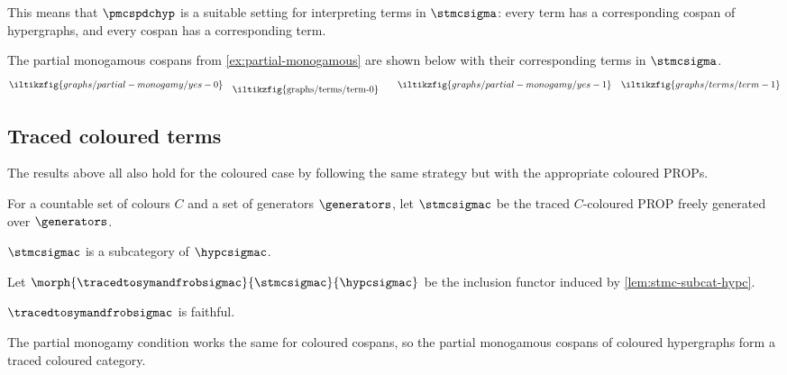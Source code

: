 This means that \(\pmcspdchyp\) is a suitable setting for interpreting terms in
\(\stmcsigma\): every term has a corresponding cospan of hypergraphs, and
every cospan has a corresponding term.

\begin{example}
    The partial monogamous cospans from \cref{ex:partial-monogamous} are shown
    below with their corresponding terms in \(\stmcsigma\).
    \[
        \iltikzfig{graphs/partial-monogamy/yes-0}
        \quad
        \raisebox{-0.5em}{\iltikzfig{graphs/terms/term-0}}
        \qquad
        \iltikzfig{graphs/partial-monogamy/yes-1}
        \quad
        \iltikzfig{graphs/terms/term-1}
    \]
\end{example}

\subsection{Traced coloured terms}

The results above all also hold for the coloured case by following the same
strategy but with the appropriate coloured PROPs.

\begin{definition}
    For a countable set of colours \(C\) and a set of generators \(\generators\),
    let \(\stmcsigmac\) be the traced \(C\)-coloured PROP freely generated over
    \(\generators\).
\end{definition}


\begin{lemma}\label{lem:stmc-subcat-hypc}
    \(\stmcsigmac\) is a subcategory of \(\hypcsigmac\).
\end{lemma}

\begin{definition}
    Let \(\morph{\tracedtosymandfrobsigmac}{\stmcsigmac}{\hypcsigmac}\) be the
    inclusion functor induced by \cref{lem:stmc-subcat-hypc}.
\end{definition}

\begin{corollary}
    \(\tracedtosymandfrobsigmac\) is faithful.
\end{corollary}

The partial monogamy condition works the same for coloured cospans, so
the partial monogamous cospans of coloured hypergraphs form a traced coloured
category.

